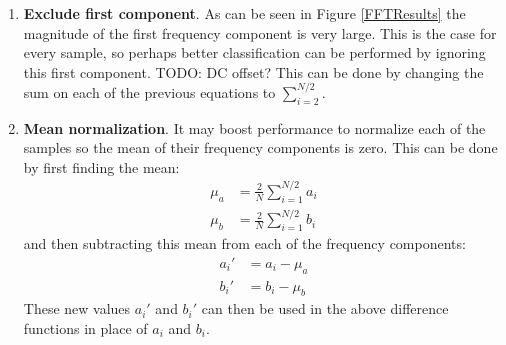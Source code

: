 \begin{enumerate}
	\item \textbf{Exclude first component}.
		As can be seen in Figure \ref{FFTResults} the magnitude of the first frequency component is very large.
		This is the case for every sample, so perhaps better classification can be performed by ignoring this first component.
		TODO: DC offset?
		This can be done by changing the sum on each of the previous equations to $\sum_{i=2}^{N/2}$.
	
	\item \textbf{Mean normalization}.
		It may boost performance to normalize each of the samples so the mean of their frequency components is zero.
		This can be done by first finding the mean:
		\begin{align}
			\mu_a &= \frac{2}{N} \sum_{i=1}^{N/2} a_i \\
			\mu_b &= \frac{2}{N} \sum_{i=1}^{N/2} b_i
		\end{align}
		and then subtracting this mean from each of the frequency components:
		\begin{align}
			a_i' &= a_i - \mu_a \\
			b_i' &= b_i - \mu_b
		\end{align}
		These new values $a_i'$ and $b_i'$ can then be used in the above difference functions in place of $a_i$ and $b_i$.
\end{enumerate}
